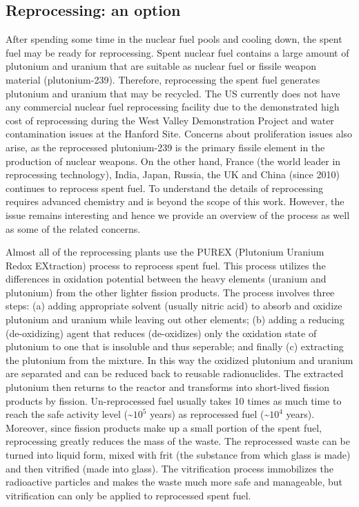 \documentclass[preprint,aip,pra]{revtex4-1}
\begin{document}
    \subsection{Reprocessing: an option}
    \label{sec:reproc}
    After spending some time in the nuclear fuel pools and cooling down, the spent fuel may be ready
    for reprocessing.
    Spent nuclear fuel contains a large amount of plutonium and uranium that are suitable as nuclear fuel
    or fissile weapon material (plutonium-239). Therefore, reprocessing the spent fuel generates plutonium and
    uranium that may be recycled. The US currently does not have any commercial nuclear fuel
    reprocessing facility due to the demonstrated high cost of reprocessing
    during the West Valley Demonstration Project and water contamination issues at the Hanford Site.
    Concerns about proliferation issues also arise, as the 
    reprocessed plutonium-239 is the primary fissile element in the production of nuclear weapons.\cite{aa12}
    On the other hand, France (the world leader in reprocessing technology), India, Japan, Russia, the UK
    and China (since 2010) continues to reprocess spent fuel. To understand the details of reprocessing
    requires advanced chemistry and is beyond the scope of this work. However, the issue remains interesting
    and hence we provide an overview of the process as well as some of the related concerns.

    Almost all of the reprocessing plants use the PUREX (Plutonium Uranium Redox EXtraction) process
    to reprocess spent fuel. This process utilizes the differences in oxidation potential 
    between the heavy elements (uranium and plutonium) from the other lighter fission products.
    The process involves three steps: (a) adding appropriate solvent (usually nitric acid) to absorb and oxidize 
    plutonium and uranium while leaving out other elements;
    (b) adding a reducing (de-oxidizing) agent that reduces (de-oxidizes) only the
    oxidation state of plutonium to one that is insoluble
    and thus seperable; and finally (c) extracting the plutonium from the mixture. In this way
    the oxidized plutonium and uranium are separated and can be reduced back to reusable radionuclides.\cite{lb01} 
    The extracted plutonium then returns to the reactor and transforms into short-lived fission products
    by fission. Un-reprocessed fuel usually takes 10 times as much time to reach the safe
    activity level (\sim$10^5$ years) as reprocessed fuel (\sim$10^4$ years). Moreover, since fission products
    make up a small portion of the spent fuel, reprocessing greatly reduces the mass of the waste. The reprocessed
    waste can be turned into liquid form, mixed with frit (the substance from which glass is made) and then
    vitrified (made into glass). The vitrification process immobilizes the radioactive particles and makes
    the waste much more safe and manageable, but vitrification can only be applied to reprocessed spent fuel.
\end{document}
